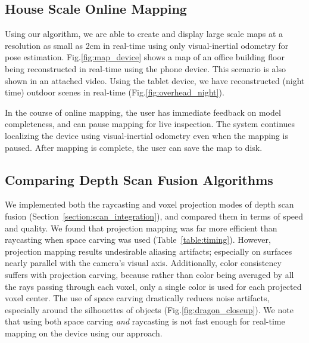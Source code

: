 \documentclass[conference]{IEEEtran}
\newcommand{\sref}[1]{Section~\ref{#1}}
\newcommand{\figref}[1]{Fig.\ref{#1}}
\newcommand{\tabref}[1]{Table~\ref{#1}}
\begin{document}
%  
%  
\subsection{House Scale Online Mapping}
\label{section:mapping}
Using our algorithm, we are able to create and display large scale maps at a
resolution as small as 2cm in real-time using only visual-inertial odometry for
pose estimation. \figref{fig:map_device} shows a map of an office building floor
being reconstructed in real-time using the phone device. This scenario is also
shown in an attached video. Using the tablet device, we have reconstructed
(night time) outdoor scenes in real-time (\figref{fig:overhead_night}).

In the course of online mapping, the user has immediate feedback on model
completeness, and can pause mapping for live inspection. The system continues
localizing the device using visual-inertial odometry even when the mapping is
paused. After mapping is complete, the user can save the map to disk.
 
\subsection{Comparing Depth Scan Fusion Algorithms} 
\label{section:scan_compare}
We implemented both the raycasting and voxel projection modes of depth scan
fusion (\sref{section:scan_integration}), and compared them in terms of
speed and quality. We found that projection mapping was far more efficient than
raycasting when space carving was used (\tabref{table:timing}). However,
projection mapping results undesirable aliasing artifacts; especially on
surfaces nearly parallel with the camera's visual axis. Additionally, color consistency suffers
with projection carving, because rather than color being averaged by all the
rays passing through each voxel, only a single color is used for each projected
voxel center. The use of space carving drastically reduces noise artifacts,
especially around the silhouettes of objects (\figref{fig:dragon_closeup}). We
note that using both space carving \emph{and} raycasting is not fast enough for real-time mapping on the device
using our approach.
\end{document}
